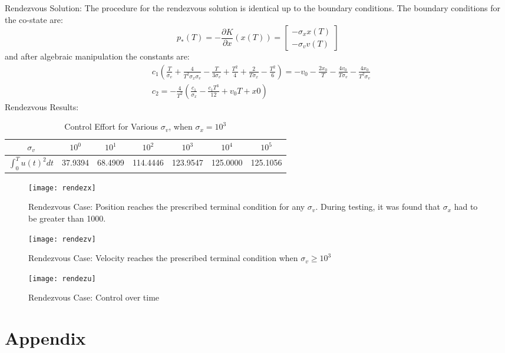 \documentclass{article}
\begin{document}
\newpage
\noindent
Rendezvous Solution:
The procedure for the rendezvous solution is identical up to the boundary conditions. The boundary conditions for the co-state are:
\begin{equation*}
	p_*(T) = -\frac{\partial K}{\partial x}(x(T)) = \begin{bmatrix} -\sigma_x x(T) \\ -\sigma_v v(T) \end{bmatrix}
\end{equation*}
and after algebraic manipulation the constants are:
\begin{align*}
	&c_1\left(\frac{T}{\sigma_v} + \frac{4}{T^2\sigma_x\sigma_v} - \frac{T}{3\sigma_v} + \frac{T^2}{4} + \frac{2}{T\sigma_x} - \frac{T^2}{6}\right) = -v_0 - \frac{2x_0}{T} - \frac{4v_0}{T\sigma_v} - \frac{4x_0}{T^2\sigma_v}\\
	&c_2 = -\frac{4}{T^2}\left(\frac{c_1}{\sigma_x} - \frac{c_1T^3}{12} + v_0T + x0\right)
\end{align*}
Rendezvous Results:
\newline
\begin{table}[H]
	\centering
	\caption{Control Effort for Various $\sigma_v$, when $\sigma_x = 10^3$}
	\begin{tabular}{c | c c c c c c}
		$\sigma_v$ & $10^0$ & $10^1$ & $10^2$ & $10^3$ & $10^4$ & $10^5$ \\
		\hline
		$\int_0^T{u(t)^2 dt}$ & 37.9394 & 68.4909 & 114.4446 & 123.9547 & 125.0000  & 125.1056
	\end{tabular}
\end{table}
\begin{figure}[H]
	\centering
	\texttt{[image: rendezx]}
	\caption{Rendezvous Case: Position reaches the prescribed terminal condition for any $\sigma_v$. During testing, it was found that $\sigma_x$ had to be greater than 1000. }
\end{figure}
\begin{figure}[H]
	\centering
	\texttt{[image: rendezv]}
	\caption{Rendezvous Case: Velocity reaches the prescribed terminal condition when $\sigma_v \geq 10^3$}
\end{figure}
\begin{figure}[H]
	\centering
	\texttt{[image: rendezu]}
	\caption{Rendezvous Case: Control over time}
\end{figure}

\newpage
\section{Appendix}
 
\end{document}
